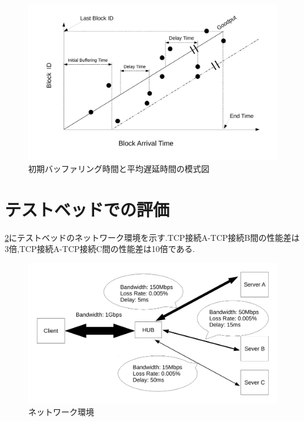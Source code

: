 \documentclass[a4j,12pt]{gradthesis_utf8}
\begin{document}
\begin{figure}[ht]
	\label{buf}
	\begin{center}
		\includegraphics[width=17cm]{figure/initialBuffering.pdf}
		\caption{初期バッファリング時間と平均遅延時間の模式図}
	\end{center}
\end{figure}

\clearpage

\section{テストベッドでの評価}
\label{testbed}
\ref{networkmodel}にテストベッドのネットワーク環境を示す.TCP接続A-TCP接続B間の性能差は3倍,TCP接続A-TCP接続C間の性能差は10倍である.
\begin{figure}[ht]
	\label{networkmodel}
	\begin{center}
		\includegraphics[width=16cm]{figure/test_network.pdf}
		\caption{ネットワーク環境}
	\end{center}
\end{figure}
\end{document}
